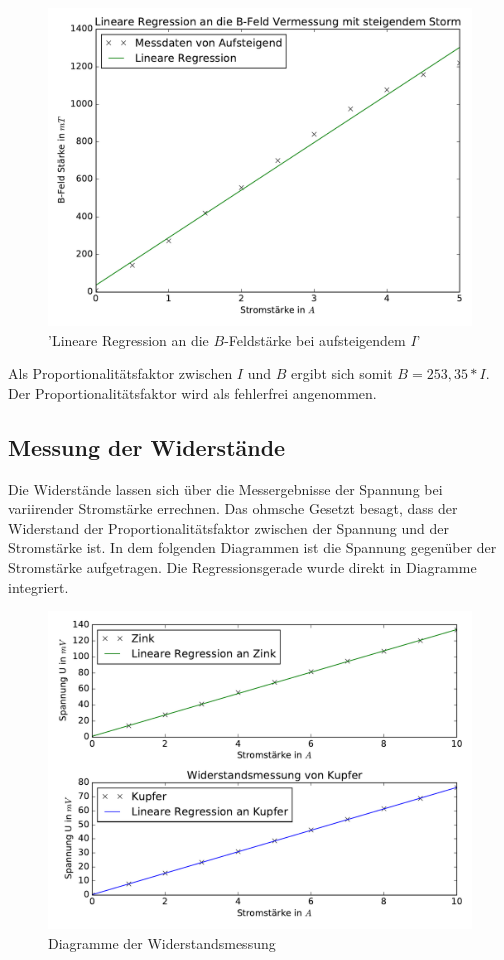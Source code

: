 \begin{figure}
  \includegraphics[width=\textwidth]{lineareRegression.pdf}
  \caption{'Lineare Regression an die $B$-Feldstärke bei aufsteigendem $I$'}
  \label{fig:lineareRegression}
\end{figure}

Als Proportionalitätsfaktor zwischen $I$ und $B$ ergibt sich somit $B =
253,35 * I$. Der Proportionalitätsfaktor wird als fehlerfrei angenommen.

\subsection{Messung der Widerstände}

Die Widerstände lassen sich über die Messergebnisse der Spannung bei variirender
Stromstärke errechnen. Das ohmsche Gesetzt besagt, dass der Widerstand der
Proportionalitätsfaktor zwischen der Spannung und der Stromstärke ist.
In dem folgenden Diagrammen ist die Spannung gegenüber der Stromstärke aufgetragen.
Die Regressionsgerade wurde direkt in Diagramme integriert.

\begin{figure}
  \includegraphics[width=\textwidth]{Widerstandsmessung.pdf}
  \caption{Diagramme der Widerstandsmessung}
  \label{fig:Widerstände}
\end{figure}

